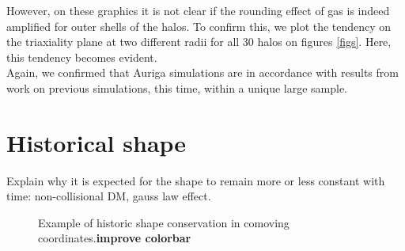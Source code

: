 However, on these graphics it is not clear if the rounding effect of gas is indeed amplified for outer shells of the halos. To confirm this, we plot the tendency on the triaxiality plane at two different radii for all 30 halos on figures \ref{figs}. Here, this tendency becomes evident.\\

Again, we confirmed that Auriga simulations are in accordance with results from work on previous simulations, this time, within a unique large sample.\\

\section{Historical shape}
Explain why it is expected for the shape to remain more or less constant with time: non-collisional DM, gauss law effect.


\begin{figure}[!ht]
  \centering
  \hfill
  \caption{Example of historic shape conservation in comoving coordinates.\textbf{improve colorbar}}
\end{figure}


